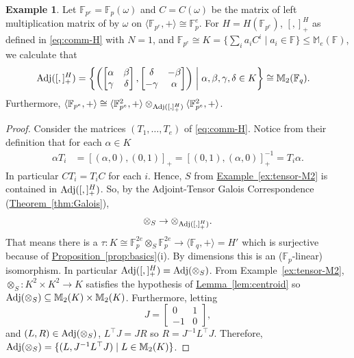 \documentclass[11pt]{article}
\numberwithin{equation}{section}
\theoremstyle{definition}
\theoremstyle{plain}
\newcommand{\expref}[2]{\hyperref[#2]{#1~\ref{#2}}}
\numberwithin{equation}{section}
\theoremstyle{plain}       %
\theoremstyle{remark}
\theoremstyle{definition}
\newtheorem{ex}[equation]{Example}  %
\numberwithin{figure}{section}
\numberwithin{table}{section}
\renewcommand{\subset}{\subseteq}
\newcommand{\bbF}{\mathbb{F}}  %
\begin{document}
\begin{ex}\label{ex:Hei-Adj}
	Let $\bbF_{p^e}=\bbF_p(\omega)$ and $C=C(\omega)$ be the matrix of left
	multiplication matrix of by $\omega$ on $\langle \bbF_{p^e},+\rangle\cong
	\bbF_p^e$. For $H=H(\bbF_{p^e})$, $[,]_+^H$ as defined in \eqref{eq:comm-H}
	with $N=1$, and $\bbF_{p^e}\cong K=\{\sum_i a_i C^i\mid a_i\in\bbF\}\leq
	\mathbb{M}_e(\bbF)$, we calculate that
	\begin{align*}
	{\rm Adj}([,]_+^H) & = \left\{
	\left(\begin{bmatrix} \alpha &\beta \\\gamma & \delta \end{bmatrix},
	\begin{bmatrix} \delta & -\beta\\ -\gamma & \alpha \end{bmatrix}\right) 
		\;\middle|\; \alpha,\beta,\gamma,\delta\in K
	\right\}\cong \mathbb{M}_2(\bbF_q).
	\end{align*}
	Furthermore, $\langle \bbF_{p^e},+\rangle\cong \langle \bbF_{p^e}^2,
	+\rangle\otimes_{{\rm Adj}([,]_+^H)}\langle \bbF^2_{p^e},+\rangle$.
\end{ex}
\begin{proof}
Consider the matrices $(T_1,\ldots,T_e)$ of \eqref{eq:comm-H}.  Notice from
their definition that for each $\alpha\in K$
\begin{align}
	\alpha T_i & = [(\alpha,0),(0,1)]_+= [(0,1),(\alpha,0)]_+^{-1}
		= T_i\alpha.
\end{align}
In particular $CT_i=T_iC$ for each $i$.  Hence, $S$ from
\expref{Example}{ex:tensor-M2} is contained in ${\rm Adj}([,]_+^H)$.  So, by the
Adjoint-Tensor Galois Correspondence (\expref{Theorem}{thm:Galois}),
\[
\otimes_{S}\to
\otimes_{{\rm Adj}([,]_+^H)}.
\]
That means there is a
$\tau:K\cong \bbF_p^{2e}\otimes_S\bbF_p^{2e}\to \langle \bbF_q,
+\rangle=H'$ which is surjective because of
\expref{Proposition}{prop:basics}(i).  By dimensions this is an
($\bbF_p$-linear) isomorphism.  In particular
${\rm Adj}([,]_+^H)={\rm Adj}(\otimes_S)$.  {}From
Example~\ref{ex:tensor-M2}, $\otimes_S:K^2\times K^2\to K$ satisfies
the hypothesis of \expref{Lemma}{lem:centroid} so
${\rm Adj}(\otimes_S)\subset \mathbb{M}_2(K)\times \mathbb{M}_2(K)$.
Furthermore, letting
\[
J=\begin{bmatrix} 0 & 1 \\ -1 & 0 \end{bmatrix},
\]
 and
$(L,R)\in {\rm Adj}(\otimes_S)$, $L^{\top}J=JR$ so
$R=J^{-1}L^{\top}J$.  Therefore,
${\rm Adj}(\otimes_S)=\{(L,J^{-1}L^{\top}J)\mid L\in
\mathbb{M}_2(K)\}$.
\end{proof}
\end{document}
